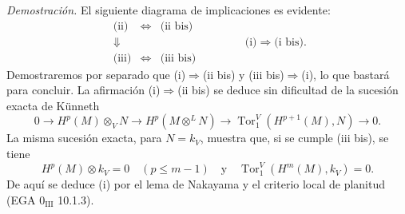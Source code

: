 \emph{Demostración.} El siguiente diagrama de implicaciones es evidente:
\[
\begin{array}{ccc}
\text{(ii)}&\Leftrightarrow&\text{(ii bis)}\\
\Downarrow&&\\
\text{(iii)}&\Leftrightarrow&\text{(iii bis)}
\end{array}
\qquad\qquad
\text{(i)}\Rightarrow\text{(i bis).}
\]
Demostraremos por separado que (i)$\Rightarrow$(ii bis) y (iii bis)$\Rightarrow$(i), lo que bastará para concluir. La afirmación (i)$\Rightarrow$(ii bis) se deduce sin dificultad de la sucesión exacta de Künneth
\[
0\to H^p(M)\otimes_V N\to H^p(M\otimes^L N)\to \operatorname{Tor}_1^V(H^{p+1}(M),N)\to0.
\]
La misma sucesión exacta, para $N=k_V$, muestra que, si se cumple (iii bis), se tiene
\[
H^p(M)\otimes k_V=0\quad(p\le m-1)\quad\text{y}\quad
\operatorname{Tor}_1^V(H^m(M),k_V)=0.
\]
De aquí se deduce (i) por el lema de Nakayama y el criterio local de planitud (EGA $0_{\mathrm{III}}$ 10.1.3).
